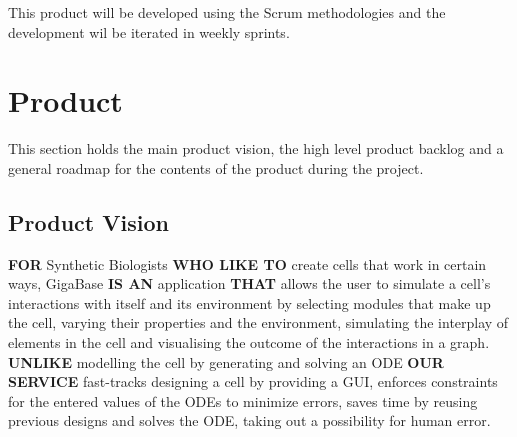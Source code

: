 \documentclass[10pt,a4paper]{report}
\begin{document}
This product will be developed using the Scrum methodologies and the development wil be iterated in weekly sprints.

	\clearpage

	\section{Product}
		This section holds the main product vision, the high level product backlog and a general roadmap for the contents of the product during the project.
		\subsection{Product Vision}

			\textbf{FOR} Synthetic Biologists \textbf{WHO LIKE TO} create cells that work in certain ways, GigaBase \textbf{IS AN} application \textbf{THAT} allows the user to simulate a cell's interactions with itself and its environment by selecting modules that make up the cell, varying their properties and the environment, simulating the interplay of elements in the cell and visualising the outcome of the interactions in a graph. \textbf{UNLIKE} modelling the cell by generating and solving an ODE \textbf{OUR SERVICE} fast-tracks designing a cell by providing a GUI, enforces constraints for the entered values of the ODEs to minimize errors, saves time by reusing previous designs and solves the ODE, taking out a possibility for human error.
\end{document}

